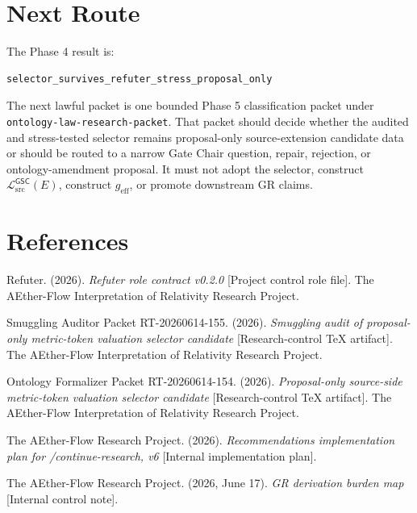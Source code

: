 \documentclass[11pt]{article}
\newcommand{\MetricData}{\mathcal{L}_{\mathrm{src}}^{\mathsf{GSC}}}
\newcommand{\geff}{g_{\mathrm{eff}}}
\begin{document}
\section{Next Route}

The Phase 4 result is:

\begin{verbatim}
selector_survives_refuter_stress_proposal_only
\end{verbatim}

The next lawful packet is one bounded Phase 5 classification packet under
\texttt{ontology-law-research-packet}. That packet should decide whether the
audited and stress-tested selector remains proposal-only source-extension
candidate data or should be routed to a narrow Gate Chair question, repair,
rejection, or ontology-amendment proposal. It must not adopt the selector,
construct \(\MetricData(E)\), construct \(\geff\), or promote downstream GR
claims.

\section*{References}

Refuter. (2026). \textit{Refuter role contract v0.2.0} [Project control role
file]. The AEther-Flow Interpretation of Relativity Research Project.

Smuggling Auditor Packet RT-20260614-155. (2026). \textit{Smuggling audit of
proposal-only metric-token valuation selector candidate} [Research-control
TeX artifact]. The AEther-Flow Interpretation of Relativity Research Project.

Ontology Formalizer Packet RT-20260614-154. (2026). \textit{Proposal-only
source-side metric-token valuation selector candidate} [Research-control TeX
artifact]. The AEther-Flow Interpretation of Relativity Research Project.

The AEther-Flow Research Project. (2026). \textit{Recommendations
implementation plan for /continue-research, v6} [Internal implementation
plan].

The AEther-Flow Research Project. (2026, June 17). \textit{GR derivation
burden map} [Internal control note].
\end{document}
